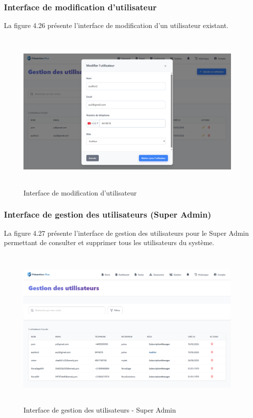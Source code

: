\subsubsection{Interface de modification d'utilisateur}
\noindent La figure 4.26 présente l'interface de modification d'un utilisateur existant.

\begin{figure}[H]
    \centering
    \includegraphics[width=14cm,height=8cm]{images/editusermodal.PNG}
    \caption{Interface de modification d'utilisateur}
\end{figure}

\subsubsection{Interface de gestion des utilisateurs (Super Admin)}
\noindent La figure 4.27 présente l'interface de gestion des utilisateurs pour le Super Admin permettant de consulter et supprimer tous les utilisateurs du système.

\begin{figure}[H]
    \centering
    \includegraphics[width=13cm,height=8cm]{images/superadminmanageusers.PNG}
    \caption{Interface de gestion des utilisateurs - Super Admin}
\end{figure}

